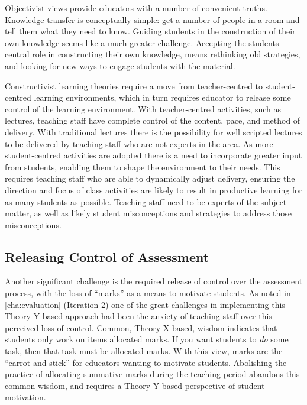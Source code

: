 Objectivist views provide educators with a number of convenient truths. Knowledge transfer is conceptually simple: get a number of people in a room and tell them what they need to know. Guiding students in the construction of their own knowledge seems like a much greater challenge. Accepting the students central role in constructing their own knowledge, means rethinking old strategies, and looking for new ways to engage students with the material. 

Constructivist learning theories require a move from teacher-centred to student-centred learning environments, which in turn requires educator to release some control of the learning environment. With teacher-centred activities, such as lectures, teaching staff have complete control of the content, pace, and method of delivery. With traditional lectures there is the possibility for well scripted lectures to be delivered by teaching staff who are not experts in the area. As more student-centred activities are adopted there is a need to incorporate greater input from students, enabling them to shape the environment to their needs. This requires teaching staff who are able to dynamically adjust delivery, ensuring the direction and focus of class activities are likely to result in productive learning for as many students as possible. Teaching staff need to be experts of the subject matter, as well as likely student misconceptions and strategies to address those misconceptions.


\subsection{Releasing Control of Assessment} %
\label{sub:releasing_control_of_assessment}

Another significant challenge is the required release of control over the assessment process, with the loss of ``marks'' as a means to motivate students. As noted in \cref{cha:evaluation} (Iteration 2) one of the great challenges in implementing this Theory-Y based approach had been the anxiety of teaching staff over this perceived loss of control. Common, Theory-X based, wisdom indicates that students only work on items allocated marks. If you want students to \emph{do} some task, then that task must be allocated marks. With this view, marks are the ``carrot and stick'' for educators wanting to motivate students. Abolishing the practice of allocating summative marks during the teaching period abandons this common wisdom, and requires a Theory-Y based perspective of student motivation.

